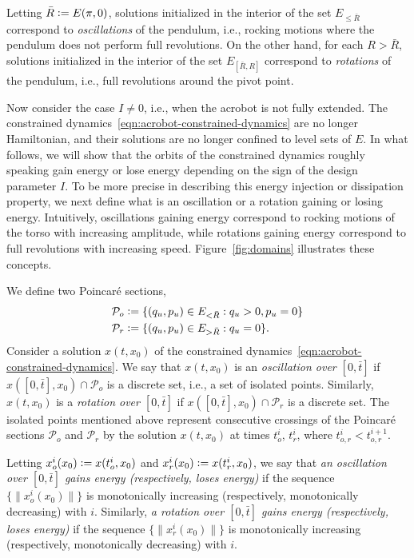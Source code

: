 \documentclass[journal,twoside,web, twocolumn,draftcls]{ieeecolor}
\newcommand*{\cP}{\mathcal{P}}
\newcommand*{\eqdef}{\vcentcolon=}
\begin{document}
Letting $\bar R \eqdef E(\pi,0)$, solutions initialized in the interior of the
set $E_{\leq \bar R}$ correspond to {\em oscillations} of the pendulum, i.e.,
rocking motions where the pendulum does not perform full revolutions. On the
other hand, for each $R>\bar R$, solutions initialized in the interior of the
set $E_{[\bar R,R]}$ correspond to {\em rotations} of the pendulum, i.e., full
revolutions around the pivot point. 

Now consider the case $I\neq 0$, i.e., when the acrobot is not fully extended.
The constrained dynamics~\eqref{eqn:acrobot-constrained-dynamics} are no longer
Hamiltonian, and their solutions are no longer confined to level sets of $E$. In
what follows, we will show that the orbits of the constrained dynamics roughly
speaking gain energy or lose energy depending on the sign of the design
parameter $I$. To be more precise in describing this energy injection or
dissipation property, we next define what is an oscillation or a rotation
gaining or losing energy. Intuitively, oscillations gaining energy correspond to
rocking motions of the torso with increasing amplitude, while rotations gaining
energy correspond to full revolutions with increasing speed.
Figure~\ref{fig:domains} illustrates these concepts.

We define two Poincar\'e sections,
\[
\begin{aligned}
\cP_o & \eqdef \{(q_u,p_u) \in E_{<\bar R}: q_u >0, p_u=0\} \\
\cP_r & \eqdef \{(q_u,p_u) \in E_{> \bar R}: q_u=0\}.
\end{aligned}
\]
Consider a solution $x(t,x_0)$ of the constrained dynamics~\eqref{eqn:acrobot-constrained-dynamics}. We say that $x(t,x_0)$ is an {\em oscillation over $[0,\bar t]$} if $x([0,\bar t],x_0) \cap \cP_o$ is a discrete set, i.e., a set of isolated points. Similarly, $x(t,x_0)$ is a {\em rotation over $[0,\bar t]$} if $x([0,\bar t],x_0) \cap \cP_r$ is a discrete set. The isolated points mentioned above represent consecutive crossings of the Poincar\'e sections $\cP_o$ and $\cP_r$ by the solution $x(t,x_0)$ at times $t^i_o$, $t^i_r$, where $t^i_{o,r} < t^{i+1}_{o,r}$. 

Letting $x^i_o(x_0) \eqdef x(t^i_o,x_0)$ and $x^i_r(x_0) \eqdef x(t^i_r,x_0)$, we say that {\em an oscillation over $[0,\bar t]$ gains energy (respectively, loses energy)} if the sequence $\{\|x^i_o(x_0)\|\}$ is monotonically increasing (respectively, monotonically decreasing) with $i$. 
Similarly, {\em a rotation over $[0,\bar t]$ gains energy (respectively, loses energy)} if the sequence $\{\|x^i_r(x_0)\|\}$ is monotonically increasing (respectively, monotonically decreasing) with $i$.
\end{document}
